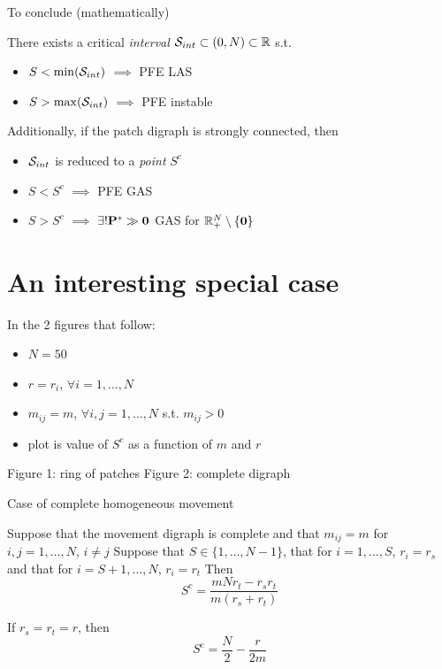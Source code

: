 \documentclass[aspectratio=169]{beamer}
\begin{document}
\begin{frame}{To conclude (mathematically)}
	\begin{theorem}\label{th:main_result}
		There exists a critical \emph{interval} $\S_{int}\subset(0,N)\subset\IR$ s.t.
		\begin{itemize}
			\item $S<\min(\S_{int})$ $\implies$ PFE LAS
			\item $S>\max(\S_{int})$ $\implies$ PFE instable
		\end{itemize}
		\vskip0.5cm
		Additionally, if the patch digraph is strongly connected, then
		\begin{itemize}
			\item $\S_{int}$ is reduced to a \emph{point}  $S^c$
			\item $S<S^c$ $\implies$ PFE GAS
			\item $S>S^c$ $\implies$ $\exists!\bP^*\gg\b0$ GAS for $\IR_+^N\setminus\{\b0\}$
		\end{itemize}
	\end{theorem}
\end{frame}



\section{An interesting special case}
\begin{frame}
	In the 2 figures that follow:
	\begin{itemize}
		\item $N=50$
		\item $r=r_i$, $\forall i=1,\ldots,N$
		\item $m_{ij}=m$, $\forall i,j=1,\ldots,N$ s.t. $m_{ij}>0$
		\item plot is value of $S^c$ as a function of $m$ and $r$
	\end{itemize}
	\vfill
	Figure 1: ring of patches
	\vfill
	Figure 2: complete digraph
\end{frame}



\begin{frame}{Case of complete homogeneous movement}
	\begin{proposition}\label{prop:Sc_mvt_complete_homog}
		Suppose that the movement digraph is complete and that $m_{ij}=m$ for $i,j=1,\ldots,N$, $i\neq j$
		\vskip0.2cm
		Suppose that $S\in\{1,\ldots,N-1\}$, that for $i=1,\ldots,S$, $r_i=r_s$ and that for $i=S+1,\ldots,N$, $r_i=r_t$
		\vskip0.2cm
		Then
		\begin{equation}\label{eq:Sc_mvt_complete_homog}
		S^c = \frac{mNr_t-r_sr_t}{m(r_s+r_t)}
		\end{equation}
	\end{proposition}
	\vfill
	If $r_s=r_t=r$, then
	\begin{equation}\label{eq:Sc_mvt_complete_homog_equal_r}
	S^c=\frac N2-\frac{r}{2m}
	\end{equation}
\end{frame}
\end{document}
